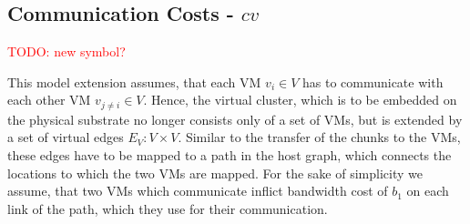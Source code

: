 \documentclass[9pt,twocolumn]{scrartcl}
\newcommand{\VM}{\textsc{VM}}
\newcommand{\Problem}{\textsc{DummyName Problem}}
\newcommand{\carlo}[1]{\textcolor{red}{#1}}
\newcommand{\VirtualNodes}{\ensuremath{V}}
\newcommand{\VirtualEdges}{\ensuremath{E_V}}
\newcommand{\VirtualNode}{v}
\newcommand{\achunk}{\ensuremath{c}}
\newcommand{\CostCom}{\ensuremath{b_1}}
\begin{document}
\begin{appendix}
%
%
%
%
%

\subsection{Communication Costs - $cv$}

\carlo{TODO: new symbol?}

This model extension assumes, that each VM  $\VirtualNode_i \in \VirtualNodes$
has to communicate with each other VM $\VirtualNode_{j \neq i} \in
\VirtualNodes$. Hence, the virtual cluster, which is to be embedded on the
physical substrate no longer consists only of a set of VMs, but is extended by a
set of virtual edges $\VirtualEdges : \VirtualNodes \times \VirtualNodes$.
Similar to the transfer of the chunks to the VMs, these edges have to be mapped
to a path in the host graph, which connects the locations to which the two VMs
are mapped. For the sake of simplicity we assume, that two VMs which communicate
inflict bandwidth cost of $\CostCom$ on each link of the path, which they use
for their communication.


\end{appendix}
\end{document}
